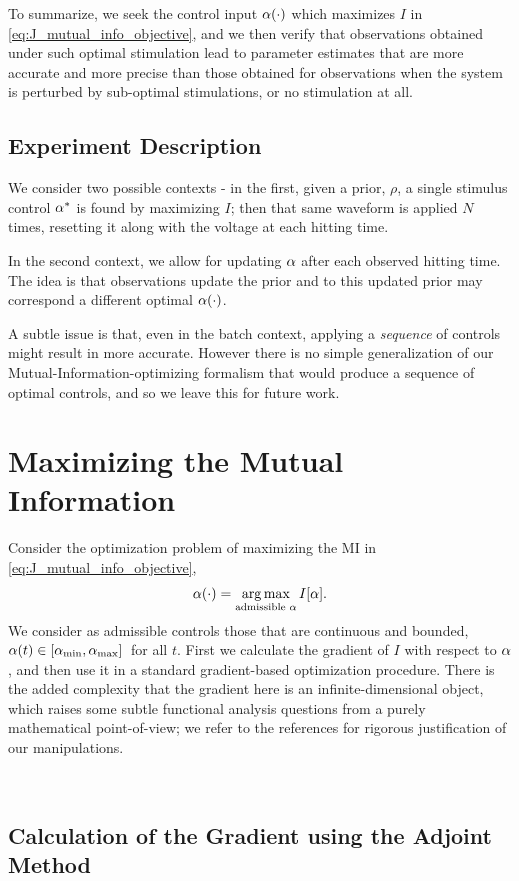 \documentclass[12pt]{article}
\begin{document}
To summarize, we seek the control input ${\alpha}(\cdot)$ which maximizes $I$ in
\cref{eq:J_mutual_info_objective}, and we then verify that observations obtained
under such optimal stimulation lead to parameter estimates that are more
accurate and more precise than those obtained for observations when the
system is perturbed by sub-optimal stimulations, or no stimulation at all.

\subsection{Experiment Description}
We consider two possible contexts - in the first, given a prior, $\rho$, a
single stimulus control ${\alpha}^*$ is found by maximizing $I$; then that same
waveform is applied $N$ times, resetting it along with the voltage at each
hitting time. 

In the second context, we allow for updating ${\alpha}$ after each observed hitting
time. The idea is that observations update the prior and to this updated
prior may correspond a different optimal ${\alpha}(\cdot)$. 

A subtle issue is that, even in the batch
context, applying a {\sl sequence} of controls might result in more
accurate. However there is no simple generalization of our
Mutual-Information-optimizing formalism that would produce a sequence of optimal
controls, and so we leave this for future work.  

\section{Maximizing the Mutual Information}
\label{sec:maximizing_MI}
Consider the optimization problem of maximizing the MI
in \cref{eq:J_mutual_info_objective}, 
$$
\a(\cdot) = \argmax_{ \textrm{admissible  } \a} I[\a].
$$ 
We consider as admissible controls those that are continuous and bounded, ${\alpha}(t) \in [{ {\alpha}_{\textrm{min}} }, { {\alpha}_{\textrm{max}} }] \,$  for all $t$. First we calculate the gradient of $I$ with respect to ${\alpha}$, and then
use it in a standard gradient-based optimization procedure. There is the added
complexity that the gradient here is an infinite-dimensional object, which raises some subtle functional analysis questions from a purely mathematical
point-of-view; we refer to the references \cite{Lenhart2007,Borzi2012} for
rigorous justification of our manipulations. 

\

\subsection{Calculation of the Gradient using the Adjoint Method}
\end{document}
